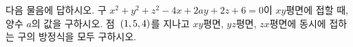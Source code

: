 다음 물음에 답하시오.
 구 $x^2+y^2+z^2-4x+2ay+2z+6=0$이 $xy$평면에 접할 때, 양수 $a$의 값을 구하시오.
 점~$(1{,}\mkern3mu\mathopen{}5{,}\mkern3mu\mathopen{}4)$를 지나고 $xy$평면, $yz$평면, $zx$평면에 동시에 접하는 구의 방정식을 모두 구하시오.
